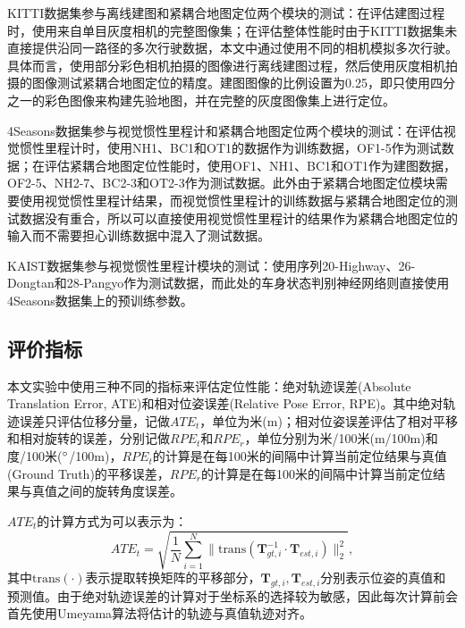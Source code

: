 KITTI数据集参与离线建图和紧耦合地图定位两个模块的测试：在评估建图过程时，使用来自单目灰度相机的完整图像集；在评估整体性能时由于KITTI数据集未直接提供沿同一路径的多次行驶数据，本文中通过使用不同的相机模拟多次行驶。具体而言，使用部分彩色相机拍摄的图像进行离线建图过程，然后使用灰度相机拍摄的图像测试紧耦合地图定位的精度。建图图像的比例设置为0.25，即只使用四分之一的彩色图像来构建先验地图，并在完整的灰度图像集上进行定位。

4Seasons数据集参与视觉惯性里程计和紧耦合地图定位两个模块的测试：在评估视觉惯性里程计时，使用NH1、BC1和OT1的数据作为训练数据，OF1-5作为测试数据；在评估紧耦合地图定位性能时，使用OF1、NH1、BC1和OT1作为建图数据，OF2-5、NH2-7、BC2-3和OT2-3作为测试数据。此外由于紧耦合地图定位模块需要使用视觉惯性里程计结果，而视觉惯性里程计的训练数据与紧耦合地图定位的测试数据没有重合，所以可以直接使用视觉惯性里程计的结果作为紧耦合地图定位的输入而不需要担心训练数据中混入了测试数据。

KAIST数据集参与视觉惯性里程计模块的测试：使用序列20-Highway、26-Dongtan和28-Pangyo作为测试数据，而此处的车身状态判别神经网络则直接使用4Seasons数据集上的预训练参数。

\subsection{评价指标}

本文实验中使用三种不同的指标来评估定位性能：绝对轨迹误差(Absolute Translation Error, ATE)\cite{sturm2012benchmark}和相对位姿误差(Relative Pose Error, RPE)\cite{geiger2012we}。其中绝对轨迹误差只评估位移分量，记做$ATE_t$，单位为米(m)；相对位姿误差评估了相对平移和相对旋转的误差，分别记做$RPE_{t}$和$RPE_{r}$，单位分别为米/100米(m/100m)和度/100米($\degree$/100m)，$RPE_{t}$的计算是在每100米的间隔中计算当前定位结果与真值(Ground Truth)的平移误差，$RPE_{r}$的计算是在每100米的间隔中计算当前定位结果与真值之间的旋转角度误差。

$ATE_t$的计算方式为可以表示为：
\begin{equation}
  ATE_t = \sqrt{\frac{1}{N}\sum_{i=1}^{N}\|\text{trans}(\symbf{T}_{gt,i}^{-1}\cdot \symbf{T}_{est,i})\|^{2}_{2}},
\end{equation}
其中$\text{trans}(\cdot)$表示提取转换矩阵的平移部分，$\symbf{T}_{gt,i}, \symbf{T}_{est,i}$分别表示位姿的真值和预测值。由于绝对轨迹误差的计算对于坐标系的选择较为敏感，因此每次计算前会首先使用Umeyama算法\cite{arun1987least}将估计的轨迹与真值轨迹对齐。

